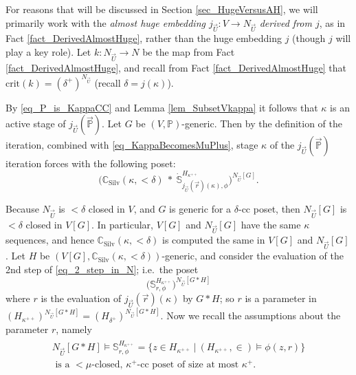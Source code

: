 \documentclass{amsart}
\begin{document}
For reasons that will be discussed in Section \ref{sec_HugeVersusAH}, we will primarily work with the \emph{almost huge embedding $j_{\vec{U}}: V \to N_{\vec{U}}$ derived from $j$}, as in Fact \ref{fact_DerivedAlmostHuge}, rather than the huge embedding $j$ (though $j$ will play a key role).  Let $k: N_{\vec{U}} \to N$ be the map from Fact \ref{fact_DerivedAlmostHuge}, and recall from Fact \ref{fact_DerivedAlmostHuge} that $\text{crit}(k) = (\delta^+)^{N_{\vec{U}}}$ (recall $\delta = j(\kappa)$).


By \eqref{eq_P_is_KappaCC} and Lemma \ref{lem_SubsetVkappa} it follows that $\kappa$ is an active stage of $j_{\vec{U}}(\vec{\mathbb{P}})$.  Let $G$ be $(V,\mathbb{P})$-generic.  Then by the definition of the iteration, combined with \eqref{eq_KappaBecomesMuPlus}, stage $\kappa$ of the $j_{\vec{U}}(\vec{\mathbb{P}})$ iteration forces with the following poset:
\begin{equation}\label{eq_2_step_in_N}
\Big(\mathbb{C}_{\text{Silv}}(\kappa, < \delta)  \ * \  \dot{\mathbb{S}}^{H_{\kappa^{++}}}_{j_{\vec{U}}(\vec{r})(\kappa), \phi} \Big)^{N_{\vec{U}}[G]}.
\end{equation}



Because $N_{\vec{U}}$ is $<\delta$ closed in $V$, and $G$ is generic for a $\delta$-cc poset, then $N_{\vec{U}}[G]$ is $<\delta$ closed in $V[G]$.  In particular, $V[G]$ and $N_{\vec{U}}[G]$ have the same $\kappa$ sequences, and hence $\mathbb{C}_{\text{Silv}}(\kappa, < \delta)$ is computed the same in $V[G]$ and $N_{\vec{U}}[G]$.  Let $H$ be $(V[G], \mathbb{C}_{\text{Silv}}(\kappa, < \delta))$-generic, and consider the evaluation of the 2nd step of \eqref{eq_2_step_in_N}; i.e.\ the poset
\begin{equation*}
\Big( \mathbb{S}^{H_{\kappa^{++}}}_{r, \phi} \Big)^{N_{\vec{U}}[G*H]}
\end{equation*}
where $r$ is the evaluation of $j_{\vec{U}}(\vec{r})(\kappa)$ by $G*H$; so $r$ is a parameter in $(H_{\kappa^{++}})^{N_{\vec{U}}[G*H]} = (H_{\delta^+})^{N_{\vec{U}}[G*H]}$.  Now we recall the assumptions about the parameter $r$, namely
\begin{align}\label{eq_RecallWhatNBelieves}
\begin{split}
N_{\vec{U}}[G*H] \models  \mathbb{S}^{H_{\kappa^{++}}}_{r,\phi}= \big\{ z \in H_{\kappa^{++}} \ |  \ (H_{\kappa^{++}}, \in) \models \phi(z,r) \big\}  \\
\text{ is a } <\mu \text{-closed, } \kappa^+ \text{-cc poset} \text{ of size at most } \kappa^+.
\end{split}
\end{align}
\end{document}

